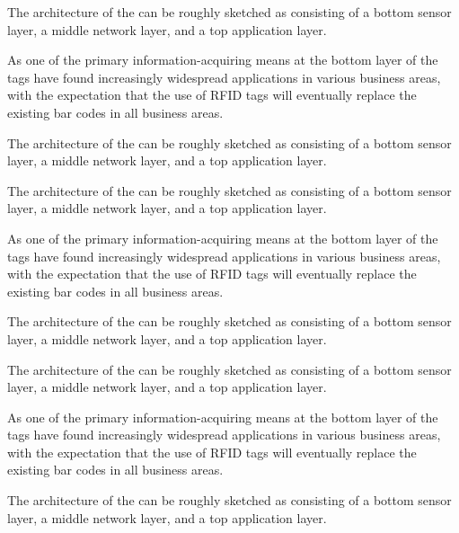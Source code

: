 \documentclass[10pt]{ietbook}
\begin{document}
The architecture of the can be roughly sketched
as consisting of a bottom sensor layer, a middle network layer, and a
top application layer. 
\begin{lemma}
{As one of the primary information-acquiring means
at the bottom layer of the
tags have found increasingly widespread applications in various business
areas, with the expectation that the use of RFID tags will eventually
replace the existing bar codes in all business areas.}
\end{lemma}
The architecture of the can be roughly sketched
as consisting of a bottom sensor layer, a middle network layer, and a
top application layer.

The architecture of the can be roughly sketched
as consisting of a bottom sensor layer, a middle network layer, and a
top application layer. 
\begin{proposition}
{As one of the primary information-acquiring means
at the bottom layer of the
tags have found increasingly widespread applications in various business
areas, with the expectation that the use of RFID tags will eventually
replace the existing bar codes in all business areas.}
\end{proposition}
The architecture of the can be roughly sketched
as consisting of a bottom sensor layer, a middle network layer, and a
top application layer.

The architecture of the can be roughly sketched
as consisting of a bottom sensor layer, a middle network layer, and a
top application layer. 
\begin{remark}
{As one of the primary information-acquiring means
at the bottom layer of the
tags have found increasingly widespread applications in various business
areas, with the expectation that the use of RFID tags will eventually
replace the existing bar codes in all business areas.}
\end{remark}
The architecture of the can be roughly sketched
as consisting of a bottom sensor layer, a middle network layer, and a
top application layer.
\end{document}
